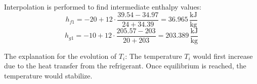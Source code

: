Interpolation is performed to find intermediate enthalpy values:  
\[
h_{f1} = -20 + 12 \cdot \frac{39.54 - 34.97}{24 + 34.39} = 36.965 \, \frac{\text{kJ}}{\text{kg}}
\]  
\[
h_{g1} = -10 + 12 \cdot \frac{205.57 - 203}{20 + 203} = 203.389 \, \frac{\text{kJ}}{\text{kg}}
\]  

The explanation for the evolution of \( T_i \):  
The temperature \( T_i \) would first increase due to the heat transfer from the refrigerant. Once equilibrium is reached, the temperature would stabilize.